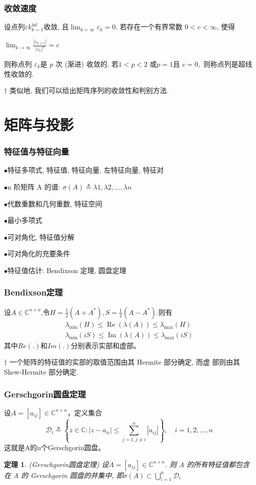 \documentclass[notheorems,serif]{beamer}
\newcommand{\hei}[1]{{\HEI#1}}
\newtheorem{theorem}{\hei{定理}}
\begin{document}
\begin{frame}
\frametitle{收敛速度}
设点列${εk}_{k=1}^{\inf}$收敛, 且$\lim _{k=\infty} \varepsilon_{k}=0$. 若存在一个有界常数 $0 < c < ∞$, 使得

$\lim _{k \rightarrow \infty} \frac{\left|\varepsilon_{k+1}\right|}{\left|\varepsilon_{k}\right|^{p}}=c$

则称点列 ${ε_k} $是 $p$ 次 (渐进) 收敛的. 若$ 1 < p < 2$ 或$ p = 1 $且 $c = 0,$ 则称点列是超线性收敛的.

$†$ 类似地, 我们可以给出矩阵序列的收敛性和判别方法.
\end{frame}

\section{矩阵与投影}
\begin{frame}
\frametitle{特征值与特征向量}
$\bullet$特征多项式, 特征值, 特征向量, 左特征向量, 特征对

$\bullet$n 阶矩阵 A 的谱: $σ(A) ≜ {λ1, λ2, . . . , λn}$

$\bullet$代数重数和几何重数, 特征空间

$\bullet$最小多项式

$\bullet$可对角化, 特征值分解

$\bullet$可对角化的充要条件

$\bullet$特征值估计: Bendixson 定理, 圆盘定理
\end{frame}

\begin{frame}
\frametitle{Bendixson定理}
设$A \in \mathbb{C}^{n \times n}$,令$H=\frac{1}{2}\left(A+A^{*}\right), S=\frac{1}{2}\left(A-A^{*}\right)$.则有
$$
\begin{array}{l}{\lambda_{\min }(H) \leq \operatorname{Re}(\lambda(A)) \leq \lambda_{\max }(H)} \\ {\lambda_{\min }(i S) \leq \operatorname{Im}(\lambda(A)) \leq \lambda_{\max }(i S)}\end{array}
$$
其中$Re(.)$和$Im(.)$分别表示实部和虚部。


† 一个矩阵的特征值的实部的取值范围由其 Hermite 部分确定, 而虚
部则由其 Skew-Hermite 部分确定.
\end{frame}

\begin{frame}
\frametitle{Gerschgorin圆盘定理}
设$A=\left[a_{i j}\right] \in \mathbb{C}^{n \times n}$，定义集合
$$
\mathcal{D}_{i} \triangleq\left\{z \in \mathbb{C} :\left|z-a_{i i}\right| \leq \sum_{j=1, j \neq i}^{n}\left|a_{i j}\right|\right\}, \quad i=1,2, \ldots, n
$$
这就是A的n个Gerschgorin圆盘。


\begin{theorem}(Gerschgorin圆盘定理)
	设$A=\left[a_{i j}\right] \in \mathbb{C}^{n \times n}$. 则 A 的所有特征值都包含在 A 的 Gerschgorin 圆盘的并集中, 即$\sigma(A) \subset \bigcup_{i=1}^{n} \mathcal{D}_{i}$
\end{theorem}
\end{frame}
\end{document}
